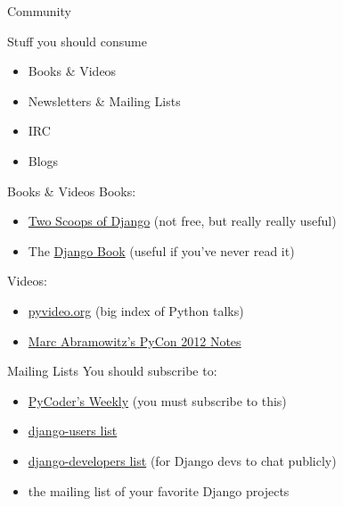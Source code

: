 \documentclass[xcolor=dvipsnames]{beamer}
\begin{document}
\begin{section}{Community}

  \begin{frame}{Stuff you should consume}
    \begin{itemize}
      \item Books \& Videos
      \item Newsletters \& Mailing Lists
      \item IRC
      \item Blogs
    \end{itemize}
  \end{frame}

  \begin{frame}{Books \& Videos}
    Books:

    \begin{itemize}
      \item \href{https://django.2scoops.org/}{Two Scoops of Django} (not free, but really really useful)
      \item The \href{http://www.djangobook.com/en/2.0/index.html}{Django Book} (useful if you've never read it)
    \end{itemize}

    Videos:

    \begin{itemize}
      \item \href{http://pyvideo.org/}{pyvideo.org} (big index of Python talks)
      \item \href{https://pycon-2012-notes.readthedocs.org/en/latest/index.html}{Marc Abramowitz's PyCon 2012 Notes}
    \end{itemize}

  \end{frame}


  \begin{frame}{Mailing Lists}
    You should subscribe to:

    \begin{itemize}
      \item \href{http://pycoders.com/}{PyCoder's Weekly} (you must subscribe to this)
      \item \href{https://groups.google.com/forum/?fromgroups\#!forum/django-users}{django-users list}
      \item \href{https://groups.google.com/forum/?fromgroups\#!forum/django-developers}{django-developers list} (for Django devs to chat publicly)
      \item the mailing list of your favorite Django projects
    \end{itemize}
  \end{frame}


\end{section}
\end{document}
